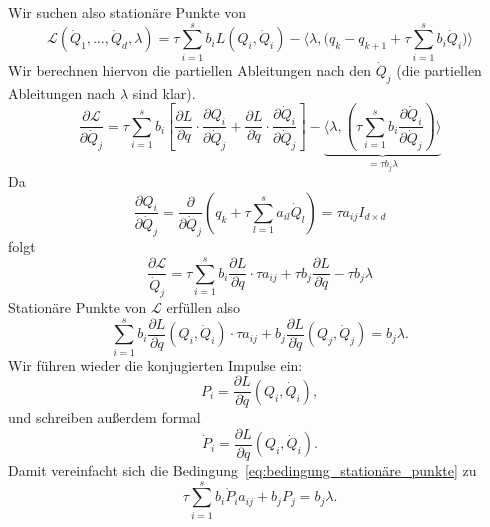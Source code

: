 Wir suchen also stationäre Punkte von
\begin{equation*}
	\mathcal{L}(\dot{Q}_1,\hdots,\dot{Q}_d,\lambda) =
	\tau \sum_{i=1}^s b_iL(Q_i,\dot{Q}_i)
	- \Big\langle \lambda, \Big( q_k - q_{k+1} + \tau\sum_{i=1}^s b_i\dot{Q}_i \Big) \Big\rangle
\end{equation*}
Wir berechnen hiervon die partiellen Ableitungen nach den $\dot{Q}_j$ (die partiellen Ableitungen nach $\lambda$ sind klar).
\begin{equation*}
	\frac{\partial\mathcal{L}}{\partial\dot{Q}_j}
	= \tau\sum_{i=1}^s b_i \left[\frac{\partial L}{\partial q}\cdot \frac{\partial Q_i}{\partial\dot{Q}_j}
	+  \frac{\partial L}{\partial \dot q}\cdot \frac{\partial \dot Q_i}{\partial\dot{Q}_j}\right]
	- \underbrace{\bigg\langle \lambda, \left( \tau\sum_{i=1}^s b_i \frac{\partial\dot{Q}_i}{\partial\dot{Q}_j}\right) \bigg\rangle}_{= \tau b_j \lambda}
\end{equation*}
Da
\begin{equation*}
	\frac{\partial Q_i}{\partial \dot{Q}_j}
	=
	\frac{\partial}{\partial \dot{Q}_j}\left( q_k+\tau \sum_{l=1}^s a_{il}\dot{Q}_l\right)
	=
	\tau a_{ij} I_{d\times d}
\end{equation*}
folgt
\begin{equation*}
	\frac{\partial\mathcal{L}}{\dot{Q}_j} = \tau\sum_{i=1}^s b_i \frac{\partial L}{\partial q}\cdot \tau a_{ij} + \tau b_j\frac{\partial L}{\partial\dot{q}} - \tau b_j\lambda
\end{equation*}
Stationäre Punkte von $\mathcal{L}$ erfüllen also
\begin{equation}
	\label{eq:bedingung_stationäre_punkte}
	\sum_{i=1}^s b_i\frac{\partial L}{\partial q}(Q_i,\dot{Q}_i)\cdot\tau a_{ij} + b_j\frac{\partial L}{\partial \dot{q}}(Q_j,\dot{Q}_j) = b_j\lambda.
\end{equation}
Wir führen wieder die konjugierten Impulse ein:
\begin{equation*}
	P_i = \frac{\partial L}{\partial\dot{q}}(Q_i,\dot{Q}_i),
\end{equation*}
und schreiben außerdem formal
\begin{equation*}
	\dot{P}_i = \frac{\partial L}{\partial q}(Q_i,\dot{Q}_i).
\end{equation*}
Damit vereinfacht sich die Bedingung~\eqref{eq:bedingung_stationäre_punkte} zu
\begin{equation}
	\label{eq:bedingung_stationäre_punkte_einfach}
	\tau\sum_{i=1}^s b_i\dot{P}_i a_{ij} + b_jP_j = b_j\lambda.
\end{equation}


